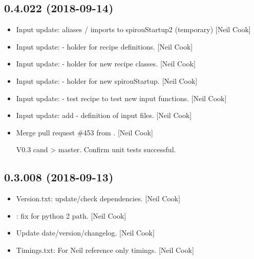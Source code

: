 \documentclass[a4paper,10pt,english]{report}
\begin{document}
\subsection{0.4.022 (2018-09-14)}
\label{\detokenize{misc/changelog:id325}}\begin{itemize}
\item {} 
Input update:  aliases / imports to
spirouStartup2 (temporary) {[}Neil Cook{]}

\item {} 
Input update:  - holder for recipe definitions. {[}Neil Cook{]}

\item {} 
Input update:  - holder for new recipe classes. {[}Neil
Cook{]}

\item {} 
Input update:  - holder for new spirouStartup. {[}Neil
Cook{]}

\item {} 
Input update:  - test recipe to test new input
functions. {[}Neil Cook{]}

\item {} 
Input update: add  - definition of input files. {[}Neil
Cook{]}

\item {} 
Merge pull request \#453 from . {[}Neil Cook{]}

V0.3 cand \textendash{}\textgreater{} master. Confirm unit tests successful.

\end{itemize}


\subsection{0.3.008 (2018-09-13)}
\label{\detokenize{misc/changelog:id326}}\begin{itemize}
\item {} 
Version.txt: update/check dependencies. {[}Neil Cook{]}

\item {} 
: fix for python 2 path. {[}Neil Cook{]}

\item {} 
Update date/version/changelog. {[}Neil Cook{]}

\item {} 
Timings.txt: For Neil reference only  timings. {[}Neil Cook{]}

\end{itemize}
\end{document}
